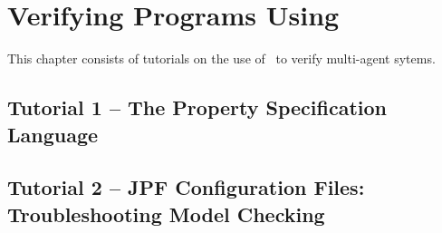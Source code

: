 %
\chapter{Verifying Programs Using \ajpf}

This chapter consists of tutorials on the use of \ajpf\ to verify multi-agent sytems.

\section{Tutorial 1 -- The Property Specification Language}

{
  \let\section\subsection
  \let\subsection\subsubsection
  \let\subsubsection\paragraph

  
  }

\section{Tutorial 2 -- JPF Configuration Files: Troubleshooting Model Checking}

{
  \let\section\subsection
  \let\subsection\subsubsection
  \let\subsubsection\paragraph

  
  }

